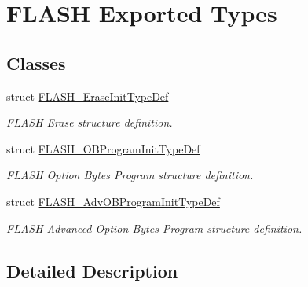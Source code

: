 \hypertarget{group___f_l_a_s_h_ex___exported___types}{}\section{F\+L\+A\+SH Exported Types}
\label{group___f_l_a_s_h_ex___exported___types}
\subsection*{Classes}
\begin{DoxyCompactItemize}
\item 
struct \hyperlink{struct_f_l_a_s_h___erase_init_type_def}{F\+L\+A\+S\+H\+\_\+\+Erase\+Init\+Type\+Def}
\begin{DoxyCompactList}\small\item\em F\+L\+A\+SH Erase structure definition. \end{DoxyCompactList}\item 
struct \hyperlink{struct_f_l_a_s_h___o_b_program_init_type_def}{F\+L\+A\+S\+H\+\_\+\+O\+B\+Program\+Init\+Type\+Def}
\begin{DoxyCompactList}\small\item\em F\+L\+A\+SH Option Bytes Program structure definition. \end{DoxyCompactList}\item 
struct \hyperlink{struct_f_l_a_s_h___adv_o_b_program_init_type_def}{F\+L\+A\+S\+H\+\_\+\+Adv\+O\+B\+Program\+Init\+Type\+Def}
\begin{DoxyCompactList}\small\item\em F\+L\+A\+SH Advanced Option Bytes Program structure definition. \end{DoxyCompactList}\end{DoxyCompactItemize}


\subsection{Detailed Description}

